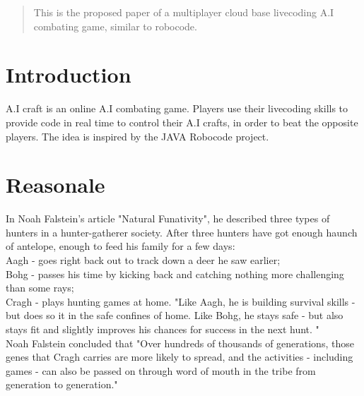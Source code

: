 \documentclass[12pt]{article}
\begin{document}
\maketitle

\begin{abstract}
This is the proposed paper of a multiplayer cloud base livecoding A.I combating game, similar to robocode.
\end{abstract}

\section{Introduction}
A.I craft is an online A.I combating game. Players use their livecoding skills to provide code in real time to control their A.I crafts, in order to beat the opposite players. The idea is inspired by the JAVA Robocode\cite{robocode01} project.

\section{Reasonale}
In Noah Falstein's article "Natural Funativity"\cite{noah2004}, he described three types of hunters in a hunter-gatherer society. After three hunters have got enough haunch of antelope, enough to feed his family for a few days:\\
Aagh - goes right back out to track down a deer he saw earlier;\\
Bohg - passes his time by kicking back and catching nothing more challenging than some rays;\\
Cragh - plays hunting games at home. "Like Aagh, he is building survival skills - but does so it in the safe confines of home. Like Bohg, he stays safe - but also stays fit and slightly improves his chances for success in the next hunt. "\\
Noah Falstein concluded that "Over hundreds of thousands of generations, those genes that Cragh carries are more likely to spread, and the activities - including games - can also be passed on through word of mouth in the tribe from generation to generation."\\
\end{document}
